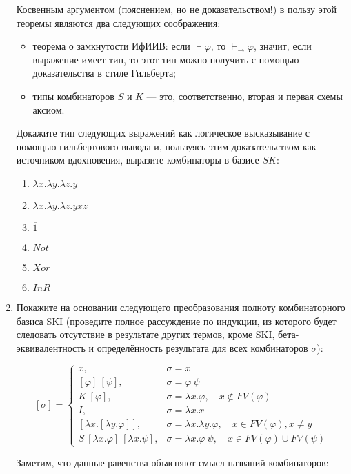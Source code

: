 \documentclass[10pt,a4paper,oneside]{article}
\begin{document}
\begin{enumerate}
Косвенным аргументом (пояснением, но не доказательством!) в пользу этой теоремы являются 
два следующих соображения:
\begin{itemize}
\item теорема о замкнутости ИфИИВ: если $\vdash \varphi$, то $\vdash_\rightarrow \varphi$,
значит, если выражение имеет тип, то этот тип можно получить с помощью доказательства в
стиле Гильберта;
\item типы комбинаторов $S$ и $K$ --- это, соответственно, вторая и первая схемы аксиом.
\end{itemize}

Докажите тип следующих выражений как логическое высказывание с помощью
гильбертового вывода и, пользуясь этим доказательством как источником вдохновения, 
выразите комбинаторы в базисе $SK$:
\begin{enumerate}
\item $\lambda x.\lambda y.\lambda z.y$
\item $\lambda x.\lambda y.\lambda z.y x z$
\item $\overline{1}$
\item $Not$
\item $Xor$
\item $InR$
\end{enumerate}

\item Покажите на основании следующего преобразования полноту комбинаторного базиса SKI
(проведите полное рассуждение по индукции, из которого будет следовать отсутствие 
в результате других термов, кроме SKI, бета-эквивалентность
и определённость результата для всех комбинаторов $\sigma$):

$$[\sigma]=\left\{\begin{array}{ll}
x, & \sigma = x\\
\left[\varphi\right]\ [\psi], & \sigma = \varphi\ \psi\\
K\ [\varphi], & \sigma = \lambda x.\varphi,\quad x \notin FV(\varphi)\\
I, & \sigma = \lambda x.x \\
\left[\lambda x.\left[\lambda y.\varphi\right]\right], & \sigma = \lambda x.\lambda y.\varphi,\quad x \in FV(\varphi), x \ne y\\
S\ [\lambda x.\varphi]\ [\lambda x.\psi], & \sigma = \lambda x.\varphi\ \psi,\quad x \in FV(\varphi)\cup FV(\psi)
\end{array}\right.$$

Заметим, что данные равенства объясняют смысл названий комбинаторов:


\end{enumerate}
\end{document}
